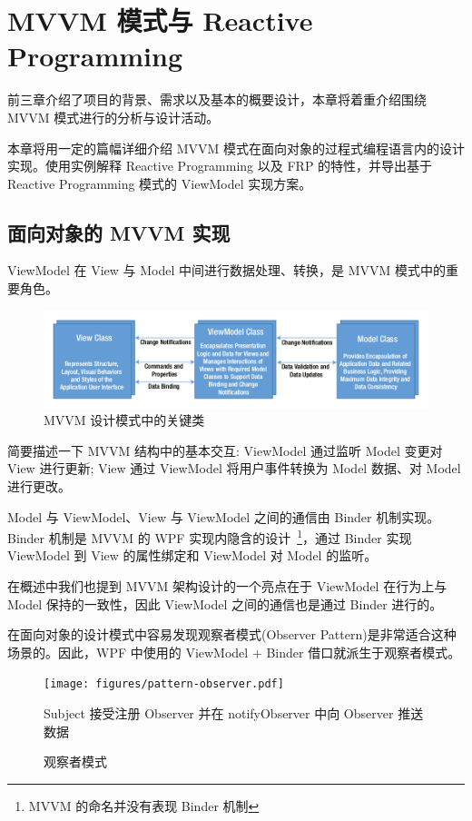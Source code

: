 \chapter{MVVM 模式与 Reactive Programming}

前三章介绍了项目的背景、需求以及基本的概要设计，本章将着重介绍围绕 MVVM 模式进行的分析与设计活动。

本章将用一定的篇幅详细介绍 MVVM 模式在面向对象的过程式编程语言内的设计实现。使用实例解释 Reactive Programming 以及 FRP 的特性，并导出基于 Reactive Programming 模式的 ViewModel 实现方案。

\section{面向对象的 MVVM 实现}

ViewModel 在 View 与 Model 中间进行数据处理、转换，是 MVVM 模式中的重要角色。

\begin{figure}[!h]
  \begin{center}
    \includegraphics[scale=0.5]{figures/diagram-mvvm-pattern-ref.png}
    \caption{MVVM 设计模式中的关键类~\cite{ghoda2012windows}\label{MVVMCoreClasses}}
  \end{center}
\end{figure}

简要描述一下 MVVM 结构中的基本交互: ViewModel 通过监听 Model 变更对 View 进行更新; View 通过 ViewModel 将用户事件转换为 Model 数据、对 Model 进行更改。

Model 与 ViewModel、View 与 ViewModel 之间的通信由 Binder 机制实现。Binder 机制是 MVVM 的 WPF 实现内隐含的设计~\footnote{MVVM 的命名并没有表现 Binder 机制}，通过 Binder 实现 ViewModel 到 View 的属性绑定和 ViewModel 对 Model 的监听。

在概述中我们也提到 MVVM 架构设计的一个亮点在于 ViewModel 在行为上与 Model 保持的一致性，因此 ViewModel 之间的通信也是通过 Binder 进行的。

在面向对象的设计模式中容易发现观察者模式(Observer Pattern)是非常适合这种场景的。因此，WPF 中使用的 ViewModel + Binder 借口就派生于观察者模式。

\begin{figure}[!h]
  \begin{center}
    \texttt{[image: figures/pattern-observer.pdf]}
    \caption{观察者模式\label{PatternObserver}}
    Subject 接受注册 Observer 并在 notifyObserver 中向 Observer 推送数据
  \end{center}
\end{figure}

